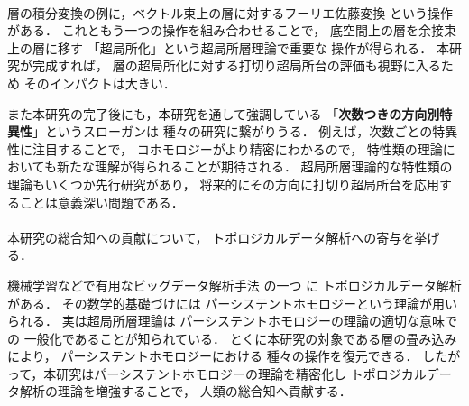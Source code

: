 \documentclass[11pt,a4paper,uplatex,dvipdfmx]{ujarticle} 		%
\newcommand{\研究課題名}{打切り超局所台を用いた層のフーリエ変換の研究とシンプレクティック幾何への応用}
\newcommand{\研究機関名}{北海道大学}
\newcommand{\研究代表者氏名}{大柴寿浩}
\begin{document}
\paragraph{}
層の積分変換の例に，ベクトル束上の層に対するフーリエ佐藤変換
という操作がある．
これともう一つの操作を組み合わせることで，
底空間上の層を余接束上の層に移す
「超局所化」という超局所層理論で重要な
操作が得られる．
本研究が完成すれば，
層の超局所化に対する打切り超局所台の評価も視野に入るため
そのインパクトは大きい．

また本研究の完了後にも，本研究を通して強調している
「\textbf{次数つきの方向別特異性}」というスローガンは
種々の研究に繋がりうる．
例えば，次数ごとの特異性に注目することで，
コホモロジーがより精密にわかるので，
特性類の理論においても新たな理解が得られることが期待される．
超局所層理論的な特性類の理論もいくつか先行研究があり，
将来的にその方向に打切り超局所台を応用することは意義深い問題である．
\vspace{-16pt}
\paragraph{}
本研究の総合知への貢献について，
トポロジカルデータ解析への寄与を挙げる．

機械学習などで有用なビッグデータ解析手法
の一つ
に
トポロジカルデータ解析
がある．
その数学的基礎づけには
パーシステントホモロジーという理論が用いられる．
実は超局所層理論は
パーシステントホモロジーの理論の適切な意味での
一般化であることが知られている．
とくに本研究の対象である層の畳み込みにより，
パーシステントホモロジーにおける
種々の操作を復元できる．
したがって，本研究はパーシステントホモロジーの理論を精密化し
トポロジカルデータ解析の理論を増強することで，
人類の総合知へ貢献する．

\vspace{-23pt}
\end{document}
